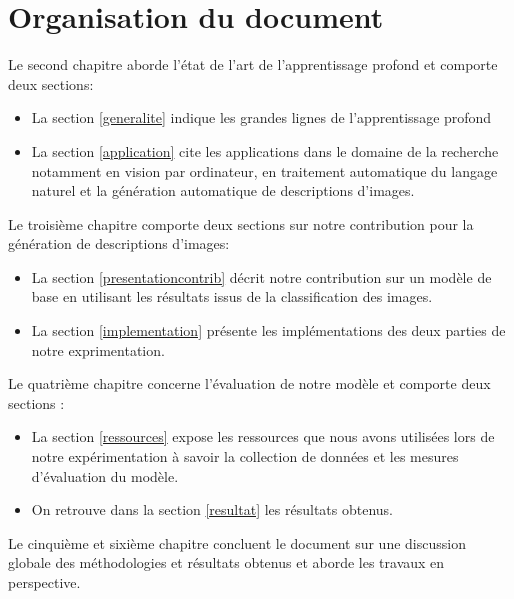 \medskip
\section{Organisation du document}

\medskip
Le second chapitre aborde l'état de l'art de l'apprentissage profond et comporte deux sections:
\begin{itemize}
	\item La section \ref{generalite} indique les grandes lignes de l'apprentissage profond
	\item La section \ref{application}  cite les applications dans le domaine de la recherche notamment en vision par ordinateur, en traitement automatique du langage naturel  et la génération automatique de descriptions d'images.
\end{itemize}
Le troisième chapitre comporte deux sections sur notre contribution pour la génération de descriptions d'images:
\begin{itemize}
	\item La section \ref{presentationcontrib} décrit notre contribution sur un modèle de base en utilisant les résultats issus de la classification des images.
	\item La section \ref{implementation} présente les implémentations des deux parties de notre exprimentation.
\end{itemize}
Le quatrième chapitre concerne l'évaluation de notre modèle et comporte deux sections :
\begin{itemize}
	\item La section \ref{ressources} expose les ressources que nous avons utilisées lors de notre expérimentation à savoir la collection de données et les mesures d'évaluation du modèle.
	\item On retrouve dans la section \ref{resultat} les résultats obtenus. 
\end{itemize}
Le  cinquième et sixième chapitre concluent le document sur une discussion globale des méthodologies et résultats obtenus et aborde les travaux en perspective.